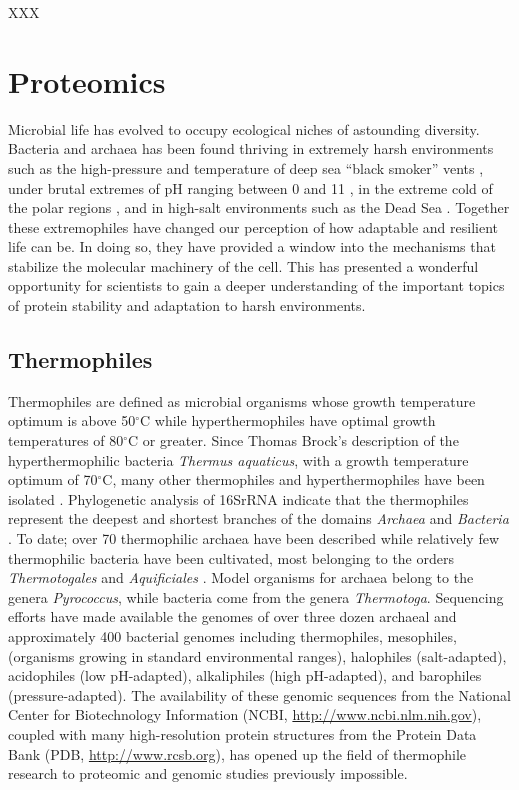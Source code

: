 XXX
\section{Proteomics}

Microbial life has evolved to occupy ecological niches of astounding diversity.
Bacteria and archaea has been found thriving in extremely harsh environments
such as the high-pressure and temperature of deep sea ``black smoker'' vents
\cite{blochl1997pfg}, under brutal extremes of pH ranging between 0 and 11
\cite{2,4}, in the extreme cold of the polar regions \cite{6,7}, and in
high-salt environments such as the Dead Sea \cite{5}.  Together these
extremophiles have changed our perception of how adaptable and resilient life
can be. In doing so, they have provided a window into the mechanisms that
stabilize the molecular machinery of the cell. This has presented a wonderful
opportunity for scientists to gain a deeper understanding of the important
topics of protein stability and adaptation to harsh environments.

\subsection{Thermophiles}

Thermophiles are defined as microbial organisms whose growth temperature
optimum is above 50$^\circ$C while hyperthermophiles have optimal growth
temperatures of 80$^\circ$C or greater. Since Thomas Brock's description of the
hyperthermophilic bacteria \emph{Thermus aquaticus}, with a growth temperature
optimum of 70$^\circ$C, many other thermophiles and hyperthermophiles have been
isolated \cite{brock1969tag}.  Phylogenetic analysis of 16SrRNA indicate that
the thermophiles represent the deepest and shortest branches of the domains
\emph{Archaea} and \emph{Bacteria} \cite{PMID_10376671}.  To date; over 70
thermophilic archaea have been described while relatively few thermophilic
bacteria have been cultivated, most belonging to the orders
\emph{Thermotogales} and \emph{Aquificiales} \cite{PMID_11256505}. Model
organisms for archaea belong to the genera \emph{Pyrococcus}, while bacteria
come from the genera \emph{Thermotoga}. Sequencing efforts have made
available the genomes of over three dozen archaeal and approximately 400
bacterial genomes including thermophiles, mesophiles, (organisms growing in
standard environmental ranges), halophiles (salt-adapted), acidophiles (low
pH-adapted), alkaliphiles (high pH-adapted), and barophiles (pressure-adapted).
The availability of these genomic sequences from the National Center for
Biotechnology Information (NCBI, \url{http://www.ncbi.nlm.nih.gov}), coupled
with many high-resolution protein structures from the Protein Data Bank (PDB,
\url{http://www.rcsb.org}), has opened up the field of thermophile research to
proteomic and genomic studies previously impossible.  

